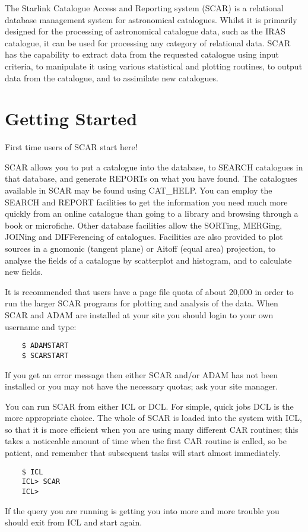 The Starlink Catalogue Access and Reporting system (SCAR) is a relational
database management system for astronomical catalogues.
Whilst it is primarily designed for the processing of astronomical catalogue
data, such as the IRAS catalogue, it can be used for processing any category of
relational data.
SCAR has the capability to extract data from the requested catalogue using input
criteria, to manipulate it using various statistical and plotting routines,
to output data from the catalogue, and to assimilate new catalogues.


\section {Getting Started}

First time users of SCAR start here!

SCAR allows you to put a catalogue into the database, to SEARCH 
catalogues in that database, and generate REPORTs on what you have found.
The catalogues available in SCAR may be found using CAT\_HELP.
You can employ the SEARCH and REPORT facilities to get the information you need
much more quickly from an online catalogue than going to a library and browsing
through a book or microfiche.
Other database facilities allow the SORTing, MERGing, JOINing and DIFFerencing
of catalogues.
Facilities are also provided to plot sources in a gnomonic (tangent plane) or
Aitoff (equal area) projection, to analyse the fields of a catalogue by
scatterplot and histogram, and to calculate new fields.

It is recommended that users have a page file quota of about 20,000 in order
to run the larger SCAR programs for plotting and analysis of the data.
When SCAR and ADAM are installed at your site you should login to your own 
username and type:
\begin{verbatim}
    $ ADAMSTART
    $ SCARSTART
\end{verbatim}
If you get an error message then either SCAR  and/or ADAM has not been 
installed or you may not have the necessary quotas; ask your site manager. 

You can run SCAR from either ICL or DCL. 
For simple, quick jobs DCL is the more appropriate choice. 
The whole of SCAR is loaded into the system with ICL, so that it is more 
efficient when you are using many different CAR routines; this takes a
noticeable amount of time when the first CAR routine is called, so
be patient, and remember that subsequent tasks will start almost immediately.
\begin{verbatim}
    $ ICL
    ICL> SCAR
    ICL>
\end{verbatim}
If the query you are running is getting you into more and more trouble
you should exit from ICL and start again.


